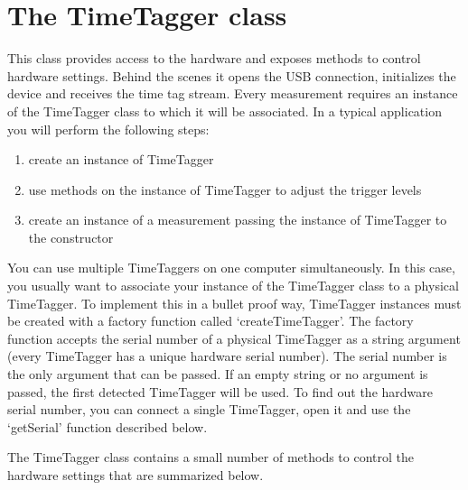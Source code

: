 \documentclass[letterpaper,10pt,english]{sphinxmanual}
\begin{document}
\section{The TimeTagger class}
\label{sections/api:the-timetagger-class}
This class provides access to the hardware and exposes methods to control hardware settings.
Behind the scenes it opens the USB connection, initializes the device
and receives the time tag stream. Every measurement requires an
instance of the TimeTagger class to which it will be associated. In a typical application
you will perform the following steps:
\begin{enumerate}
\item {} 
create an instance of TimeTagger

\item {} 
use methods on the instance of TimeTagger to adjust the trigger levels

\item {} 
create an instance of a measurement passing the instance of TimeTagger to the constructor

\end{enumerate}

You can use multiple TimeTaggers on one computer simultaneously. In this case, you usually want to
associate your instance of the TimeTagger class to a physical TimeTagger. To
implement this in a bullet proof way, TimeTagger instances must be created
with a factory function called `createTimeTagger'. The factory function accepts
the serial number of a physical TimeTagger as a string argument (every
TimeTagger has a unique hardware serial number). The serial number is the only argument that can
be passed. If an empty string or no argument is passed, the first detected
TimeTagger will be used. To find out the hardware serial number, you can connect
a single TimeTagger, open it and use the `getSerial' function described below.

The TimeTagger class contains a small number of methods to control the hardware settings that are summarized below.
\end{document}
